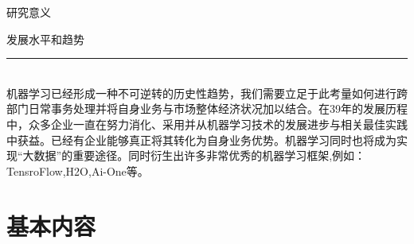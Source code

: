 \documentclass{ctexbeamer}
\begin{document}
    \begin{frame}[plain]{研究意义}
        \begin{center}
            \LARGE{发展水平和趋势}
        \end{center}
        \rule[5pt]{10cm}{0.005em}\\
        \small 机器学习已经形成一种不可逆转的历史性趋势，我们需要立足于此考量如何进行跨部门日常事务处理并将自身业务与市场整体经济状况加以结合。在39年的发展历程中，众多企业一直在努力消化、采用并从机器学习技术的发展进步与相关最佳实践中获益。已经有企业能够真正将其转化为自身业务优势。机器学习同时也将成为实现“大数据”的重要途径。同时衍生出许多非常优秀的机器学习框架,例如：TensroFlow,H2O,Ai-One等。\\
    \end{frame}

    \section{基本内容}
\end{document}
